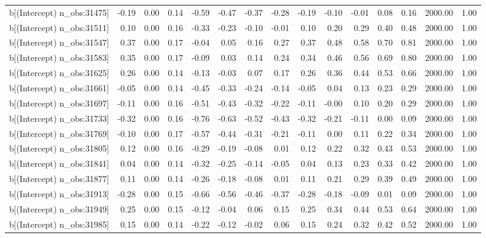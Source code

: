 \begin{table}[ht]
\begin{tabular}{rrrrrrrrrrrrrrr}
  b[(Intercept) n\_obs:31475] & -0.19 & 0.00 & 0.14 & -0.59 & -0.47 & -0.37 & -0.28 & -0.19 & -0.10 & -0.01 & 0.08 & 0.16 & 2000.00 & 1.00 \\ 
  b[(Intercept) n\_obs:31511] & 0.10 & 0.00 & 0.16 & -0.33 & -0.23 & -0.10 & -0.01 & 0.10 & 0.20 & 0.29 & 0.40 & 0.48 & 2000.00 & 1.00 \\ 
  b[(Intercept) n\_obs:31547] & 0.37 & 0.00 & 0.17 & -0.04 & 0.05 & 0.16 & 0.27 & 0.37 & 0.48 & 0.58 & 0.70 & 0.81 & 2000.00 & 1.00 \\ 
  b[(Intercept) n\_obs:31583] & 0.35 & 0.00 & 0.17 & -0.09 & 0.03 & 0.14 & 0.24 & 0.34 & 0.46 & 0.56 & 0.69 & 0.80 & 2000.00 & 1.00 \\ 
  b[(Intercept) n\_obs:31625] & 0.26 & 0.00 & 0.14 & -0.13 & -0.03 & 0.07 & 0.17 & 0.26 & 0.36 & 0.44 & 0.53 & 0.66 & 2000.00 & 1.00 \\ 
  b[(Intercept) n\_obs:31661] & -0.05 & 0.00 & 0.14 & -0.45 & -0.33 & -0.24 & -0.14 & -0.05 & 0.04 & 0.13 & 0.23 & 0.29 & 2000.00 & 1.00 \\ 
  b[(Intercept) n\_obs:31697] & -0.11 & 0.00 & 0.16 & -0.51 & -0.43 & -0.32 & -0.22 & -0.11 & -0.00 & 0.10 & 0.20 & 0.29 & 2000.00 & 1.00 \\ 
  b[(Intercept) n\_obs:31733] & -0.32 & 0.00 & 0.16 & -0.76 & -0.63 & -0.52 & -0.43 & -0.32 & -0.21 & -0.11 & 0.00 & 0.09 & 2000.00 & 1.00 \\ 
  b[(Intercept) n\_obs:31769] & -0.10 & 0.00 & 0.17 & -0.57 & -0.44 & -0.31 & -0.21 & -0.11 & 0.00 & 0.11 & 0.22 & 0.34 & 2000.00 & 1.00 \\ 
  b[(Intercept) n\_obs:31805] & 0.12 & 0.00 & 0.16 & -0.29 & -0.19 & -0.08 & 0.01 & 0.12 & 0.22 & 0.32 & 0.43 & 0.53 & 2000.00 & 1.00 \\ 
  b[(Intercept) n\_obs:31841] & 0.04 & 0.00 & 0.14 & -0.32 & -0.25 & -0.14 & -0.05 & 0.04 & 0.13 & 0.23 & 0.33 & 0.42 & 2000.00 & 1.00 \\ 
  b[(Intercept) n\_obs:31877] & 0.11 & 0.00 & 0.14 & -0.26 & -0.18 & -0.08 & 0.01 & 0.11 & 0.21 & 0.29 & 0.39 & 0.49 & 2000.00 & 1.00 \\ 
  b[(Intercept) n\_obs:31913] & -0.28 & 0.00 & 0.15 & -0.66 & -0.56 & -0.46 & -0.37 & -0.28 & -0.18 & -0.09 & 0.01 & 0.09 & 2000.00 & 1.00 \\ 
  b[(Intercept) n\_obs:31949] & 0.25 & 0.00 & 0.15 & -0.12 & -0.04 & 0.06 & 0.15 & 0.25 & 0.34 & 0.44 & 0.53 & 0.64 & 2000.00 & 1.00 \\ 
  b[(Intercept) n\_obs:31985] & 0.15 & 0.00 & 0.14 & -0.22 & -0.12 & -0.02 & 0.06 & 0.15 & 0.24 & 0.32 & 0.42 & 0.52 & 2000.00 & 1.00 \\ 

\end{tabular}
\end{table}
